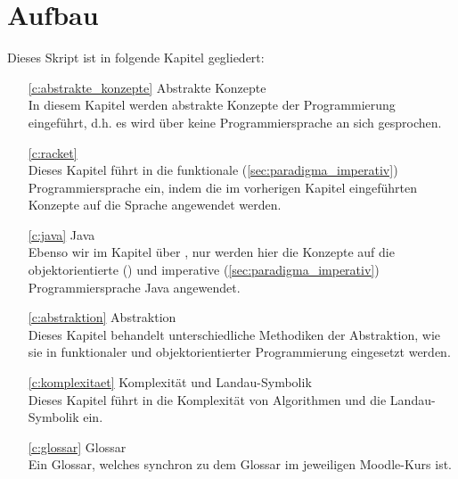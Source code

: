 
\section{Aufbau}
	Dieses Skript ist in folgende Kapitel gegliedert:
	\begin{itemize}
		\item[\ref{c:abstrakte_konzepte}] Abstrakte Konzepte \\ In diesem Kapitel werden abstrakte Konzepte der Programmierung eingeführt, d.h. es wird über keine Programmiersprache an sich gesprochen.
		\item[\ref{c:racket}] \racket \\ Dieses Kapitel führt in die funktionale (\ref{sec:paradigma_imperativ}) Programmiersprache \racket ein, indem die im vorherigen Kapitel eingeführten Konzepte auf die Sprache angewendet werden.
		\item[\ref{c:java}] Java \\ Ebenso wir im Kapitel über \racket, nur werden hier die Konzepte auf die objektorientierte () und imperative (\ref{sec:paradigma_imperativ}) Programmiersprache Java angewendet.
		\item[\ref{c:abstraktion}] Abstraktion \\ Dieses Kapitel behandelt unterschiedliche Methodiken der Abstraktion, wie sie in funktionaler und objektorientierter Programmierung eingesetzt werden.
		\item[\ref{c:komplexitaet}] Komplexität und Landau-Symbolik \\ Dieses Kapitel führt in die Komplexität von Algorithmen und die Landau-Symbolik ein.
		\item[\ref{c:glossar}] Glossar \\ Ein Glossar, welches synchron zu dem Glossar im jeweiligen Moodle-Kurs ist.
	\end{itemize}
